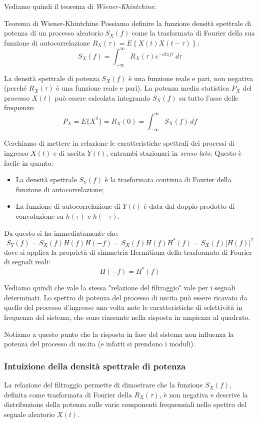 \documentclass[a4paper,11pt]{article}
\begin{document}
Vediamo quindi il teorema di \textit{Wiener-Khintchine}:
\begin{theorem}{Teorema di Wiener-Khintchine}
Possiamo definire la funzione densità spettrale di potenza di un processo aleatorio $S_X(f)$ come la trasformata di Fourier della sua funzione di autocorrelazione $R_X(\tau) = E\left\{ X(t) X(t - \tau) \right\}$:
$$
S_X(f) = \int_{-\infty}^{\infty} R_X(\tau) e^{-i 2 \pi f \tau} \, d\tau
$$
\end{theorem}

La densità spettrale di potenza $S_X(f)$ è una funzione reale e pari, non negativa (perché $R_X(\tau)$ è una funzione reale e pari).
La potenza media statistica $P_X$ del processo $X(t)$ può essere calcolata integrando $S_X(f)$ su tutto l’asse delle frequenze:
$$
P_X = E\{X^2\} = R_X(0) = \int_{-\infty}^{\infty} S_X(f) \, df
$$

\par\smallskip

Cerchiamo di mettere in relazione le caratteristiche spettrali dei processi di
ingresso $X(t)$ e di uscita $Y(t)$, entrambi stazionari in \textit{senso lato}. Questo è facile in quanto:
\begin{itemize}
	\item La densità spettrale $S_Y(f)$ è la trasformata continua di Fourier della funzione di autocorrelazione;
	\item La funzione di autocorrelazione di $Y(t)$ è data dal doppio prodotto di convoluzione su $h(\tau)$ e $h(-\tau)$.
\end{itemize}

Da questo si ha immediatamente che:
$$
S_Y(f) = S_X(f) H(f) H(-f) = S_X(f) H(f) H^*(f) = S_X(f) |H(f)|^2
$$
dove si applica la proprietà di simmetria Hermitiana della trasformata di Fourier di segnali reali:
$$
H(-f) = H^*(f)
$$

Vediamo quindi che vale la stessa "relazione del filtraggio" vale per i segnali determinati. Lo spettro di potenza del processo di uscita può essere ricavato da quello del processo d’ingresso una volta note le caratteristiche di selettività in frequenza del sistema, che sono riassunte nella risposta in ampiezza al quadrato. 

Notiamo a questo punto che la risposta in fase del sistema non influenza la potenza del processo di uscita (e infatti si prendono i moduli).

\subsubsection{Intuizione della densità spettrale di potenza}
La relazione del filtraggio permette di dimostrare che la funzione $S_X(f)$, definita come trasformata di Fourier della $R_X(\tau)$, è non negativa e descrive la distribuzione della potenza sulle varie componenti frequenziali nello spettro del segnale aleatorio $X(t)$. 
\end{document}
